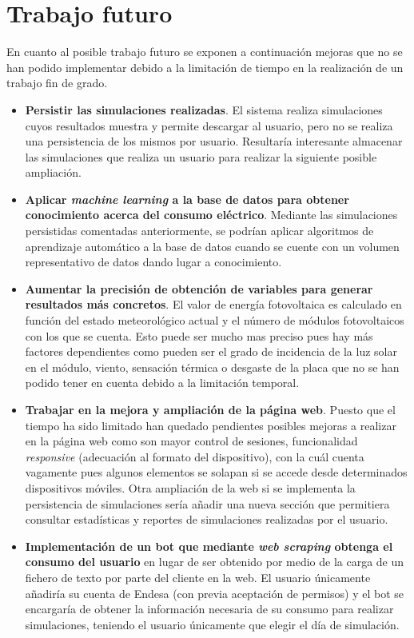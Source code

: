\section{Trabajo futuro}
En cuanto al posible trabajo futuro se exponen a continuación mejoras que no se han podido implementar debido a la limitación de tiempo en la realización de un trabajo fin de grado.
\begin{itemize}
\item \textbf{Persistir las simulaciones realizadas}. El sistema realiza simulaciones cuyos resultados muestra y permite descargar al usuario, pero no se realiza una persistencia de los mismos por usuario. Resultaría interesante almacenar las simulaciones que realiza un usuario para realizar la siguiente posible ampliación.
\item \textbf{Aplicar \textit{machine learning} a la base de datos para obtener conocimiento acerca del consumo eléctrico}. Mediante las simulaciones persistidas comentadas anteriormente, se podrían aplicar algoritmos de aprendizaje automático a la base de datos cuando se cuente con un volumen representativo de datos dando lugar a conocimiento.
\item \textbf{Aumentar la precisión de obtención de variables para generar resultados más concretos}. El valor de energía fotovoltaica es calculado en función del estado meteorológico actual y el número de módulos fotovoltaicos con los que se cuenta. Esto puede ser mucho mas preciso pues hay más factores dependientes como pueden ser el grado de incidencia de la luz solar en el módulo, viento, sensación térmica o desgaste de la placa que no se han podido tener en cuenta debido a la limitación temporal.
\item \textbf{Trabajar en la mejora y ampliación de la página web}. Puesto que el tiempo ha sido limitado han quedado pendientes posibles mejoras a realizar en la página web como son mayor control de sesiones, funcionalidad \textit{responsive} (adecuación al formato del dispositivo), con la cuál cuenta vagamente pues algunos elementos se solapan si se accede desde determinados dispositivos móviles. Otra ampliación de la web si se implementa la persistencia de simulaciones sería añadir una nueva sección que permitiera consultar estadísticas y reportes de simulaciones realizadas por el usuario.
\item \textbf{Implementación de un bot que mediante \textit{web scraping} obtenga el consumo del usuario} en lugar de ser obtenido por medio de la carga de un fichero de texto por parte del cliente en la web. El usuario únicamente añadiría su cuenta de Endesa (con previa aceptación de permisos) y el bot se encargaría de obtener la información necesaria de su consumo para realizar simulaciones, teniendo el usuario únicamente que elegir el día de simulación.
\end{itemize}

